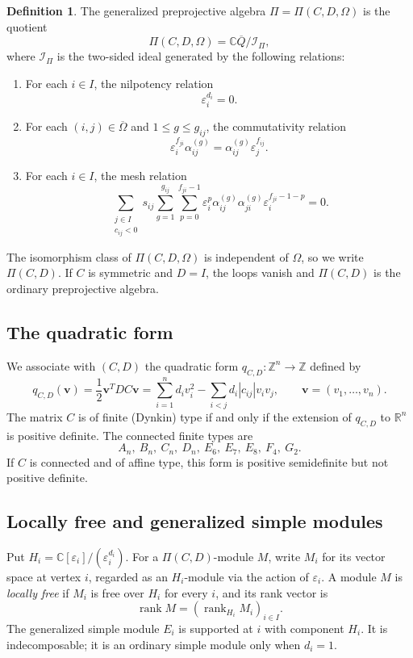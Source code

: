 \documentclass[12pt,reqno]{amsart}
\numberwithin{equation}{section}
\theoremstyle{definition}
\newtheorem{definition}[theorem]{Definition}
\theoremstyle{remark}
\newcommand{\C}{\mathbb C}
\newcommand{\rk}{\rank}
\newcommand{\eps}{\varepsilon}
\newcommand{\rank}{\operatorname{rank}}
\theoremstyle{plain}
\theoremstyle{plain}
\begin{document}
    \begin{definition}\label{def:Pi}
    The generalized preprojective algebra $\Pi=\Pi(C,D,\Omega)$ is the quotient
    \[
    \Pi(C,D,\Omega)
    =
    \mathbb{C}\overline{Q}/\mathcal{I}_{\Pi},
   \]
   where $\mathcal{I}_{\Pi}$ is the two-sided ideal generated by the following relations:
    \begin{enumerate}
    \item For each $i\in I$, the nilpotency relation
    \[
    \varepsilon_i^{d_i}=0.
    \]
    \item For each $(i,j)\in\overline{\Omega}$ and
    $1\leq g\leq g_{ij}$, the commutativity relation
    \[
    \varepsilon_i^{f_{ji}}\alpha_{ij}^{(g)}
    =
    \alpha_{ij}^{(g)}\varepsilon_j^{f_{ij}}.
    \]
    \item For each $i\in I$, the mesh relation
    \[
    \sum_{\substack{j\in I\\c_{ij}<0}}
    s_{ij}
    \sum_{g=1}^{g_{ij}}
    \sum_{p=0}^{f_{ji}-1}
    \varepsilon_i^p
    \alpha_{ij}^{(g)}\alpha_{ji}^{(g)}
    \varepsilon_i^{f_{ji}-1-p}
    =0.
    \]
    \end{enumerate}
    \end{definition}

    The isomorphism class of $\Pi(C,D,\Omega)$ is independent of $\Omega$, so we write $\Pi(C,D)$. If $C$ is symmetric and $D=I$, the loops vanish and $\Pi(C,D)$ is the ordinary preprojective algebra.

\subsection{The quadratic form}
    We associate with $(C,D)$ the quadratic form $q_{C,D}:\mathbb{Z}^n\to\mathbb{Z}$ defined by
    \[
    q_{C,D}(\mathbf{v})
    =
    \frac{1}{2}\mathbf{v}^{T}DC\mathbf{v}
    =
    \sum_{i=1}^{n}d_i v_i^2 - \sum_{i<j}d_i|c_{ij}|v_i v_j,
    \qquad
    \mathbf{v}=(v_1,\ldots,v_n).
    \]
    The matrix $C$ is of finite (Dynkin) type if and only if the extension of $q_{C,D}$ to $\mathbb{R}^n$ is positive definite. The connected finite types are
    \[
    A_n,\ B_n,\ C_n,\ D_n,\ E_6,\ E_7,\ E_8,\ F_4,\ G_2.
    \]
    If $C$ is connected and of affine type, this form is positive semidefinite but not positive definite.
    
\subsection{Locally free and generalized simple modules}
   Put $H_i=\C[\eps_i]/(\eps_i^{d_i})$. For a $\Pi(C,D)$-module $M$, write $M_i$ for its vector space at vertex $i$, regarded as an $H_i$-module via the action of $\varepsilon_i$. A module $M$ is \emph{locally free} if $M_i$ is free over $H_i$ for every $i$, and its rank vector is
   \[
   \rk M=(\rk_{H_i}M_i)_{i\in I}.
   \]
   The generalized simple module $E_i$ is supported at $i$ with component $H_i$. It is indecomposable; it is an ordinary simple module only when $d_i=1$.
\end{document}
